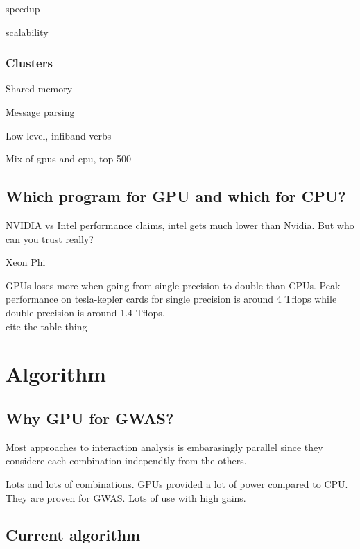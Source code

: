 \documentclass[10pt,a4paper]{article}
\begin{document}
speedup

scalability

\subsubsection{Clusters}
Shared memory

Message parsing

Low level, infiband verbs

Mix of gpus and cpu, top 500

\subsection{Which program for GPU and which for CPU?}
NVIDIA vs Intel performance claims, intel gets much lower than Nvidia. But who can you trust really?

Xeon Phi

GPUs loses more when going from single precision to double than CPUs. Peak performance on tesla-kepler cards for single precision is around 4 Tflops while double precision is around 1.4 Tflops. \cite{nvtesla}\\ cite the table thing

\section{Algorithm}


\subsection{Why GPU for GWAS?}
Most approaches to interaction analysis is embarasingly parallel since they considere each combination independtly from the others. 

Lots and lots of combinations. GPUs provided a lot of power compared to CPU. They are proven for GWAS. Lots of use with high gains.

\subsection{Current algorithm}

\end{document}
